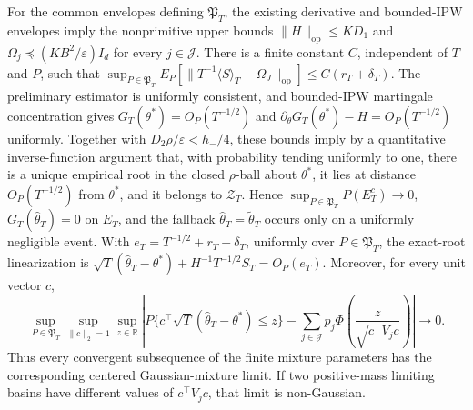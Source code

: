 For the common envelopes defining \(\mathfrak P_T\), the existing derivative and bounded-IPW envelopes imply the nonprimitive upper bounds \(\|H\|_{\mathrm{op}}\le KD_1\) and \(\Omega_j\preceq(KB^2/\varepsilon)I_d\) for every \(j\in\mathcal J\). There is a finite constant \(C\), independent of \(T\) and \(P\), such that \(\sup_{P\in\mathfrak P_T}E_P[\|T^{-1}\langle S\rangle_T-\Omega_J\|_{\mathrm{op}}]\le C(r_T+\delta_T)\). The preliminary estimator is uniformly consistent, and bounded-IPW martingale concentration gives \(G_T(\theta^*)=O_P(T^{-1/2})\) and \(\partial_\theta G_T(\theta^*)-H=O_P(T^{-1/2})\) uniformly. Together with \(D_2\rho/\varepsilon<h_-/4\), these bounds imply by a quantitative inverse-function argument that, with probability tending uniformly to one, there is a unique empirical root in the closed \(\rho\)-ball about \(\theta^*\), it lies at distance \(O_P(T^{-1/2})\) from \(\theta^*\), and it belongs to \(\mathcal Z_T\). Hence \(\sup_{P\in\mathfrak P_T}P(E_T^c)\to0\), \(G_T(\widehat\theta_T)=0\) on \(E_T\), and the fallback \(\widehat\theta_T=\widetilde\theta_T\) occurs only on a uniformly negligible event. With \(e_T=T^{-1/2}+r_T+\delta_T\), uniformly over \(P\in\mathfrak P_T\), the exact-root linearization is \(\sqrt T(\widehat\theta_T-\theta^*)+H^{-1}T^{-1/2}S_T=O_P(e_T)\). Moreover, for every unit vector \(c\),
\[
 \sup_{P\in\mathfrak P_T}\sup_{\|c\|_2=1}\sup_{z\in\mathbb R}\left|P\{c^\top\sqrt T(\widehat\theta_T-\theta^*)\le z\}-\sum_{j\in\mathcal J}p_j\Phi\!\left(\frac{z}{\sqrt{c^\top V_jc}}\right)\right|\to0.
\]
Thus every convergent subsequence of the finite mixture parameters has the corresponding centered Gaussian-mixture limit. If two positive-mass limiting basins have different values of \(c^\top V_jc\), that limit is non-Gaussian.